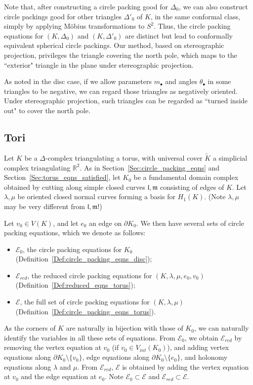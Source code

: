 \documentclass[12pt]{amsart}
\numberwithin{equation}{section}
\theoremstyle{named}
\newcommand{\refsec}[1]{Section~\ref{Sec:#1}}
\newcommand{\refdef}[1]{Definition~\ref{Def:#1}}
\newcommand{\R}{\mathbb{R}}
\begin{document}
Note that, after constructing a circle packing good for $\Delta_0$, we can also construct circle packings good for other triangles $\Delta'_0$ of $K$, in the same conformal class, simply by applying M\"{o}bius transformations to $S^2$. Thus, the circle packing equations for $(K, \Delta_0)$ and $(K, \Delta'_0)$ are distinct but lead to conformally equivalent spherical circle packings. Our method, based on stereographic projection, privileges the triangle covering the north pole, which maps to the ``exterior" triangle in the plane under stereographic projection. 

As noted in the disc case, if we allow parameters $m_\bullet$ and angles $\theta_\bullet$ in some triangles to be negative, we can regard those triangles as negatively oriented. Under stereographic projection, such triangles can be regarded as ``turned inside out" to cover the north pole.



\subsection{Tori}
\label{Sec:tori}


Let $K$ be a $\Delta$-complex triangulating a torus, with universal cover $\widetilde{K}$ a simplicial complex triangulating $\R^2$. As in \refsec{circle_packing_eqns} and \refsec{torus_eqns_satisfied}, let $K_0$ be a fundamental domain complex obtained by cutting along simple closed curves $\mathfrak{l}, \mathfrak{m}$ consisting of edges of $K$. Let $\lambda, \mu$ be oriented closed normal curves forming a basis for $H_1 (K)$. (Note $\lambda, \mu$ may be very different from $\mathfrak{l},\mathfrak{m}$!)

Let $v_0 \in V(K)$, and let $e_0$ an edge on $\partial K_0$. We then have several sets of circle packing equations, which we denote as follows:
\begin{itemize}
\item $\mathcal{E}_0$, the circle packing equations for $K_0$ (\refdef{circle_packing_eqns_disc});
\item $\mathcal{E}_{red}$, the reduced circle packing equations for $(K, \lambda, \mu, e_0, v_0)$ (\refdef{reduced_eqns_torus});
\item $\mathcal{E}$, the full set of circle packing equations for $(K, \lambda, \mu)$ (\refdef{circle_packing_eqns_torus}).
\end{itemize}
As the corners of $K$ are naturally in bijection with those of $K_0$, we can naturally identify the variables in all these sets of equations. From $\mathcal{E}_0$, we obtain $\mathcal{E}_{red}$ by removing the vertex equation at $v_0$ (if $v_0 \in V_{int}(K_0)$), and adding vertex equations along $\partial K_0 \setminus \{v_0\}$, edge equations along $\partial K_0 \setminus \{e_0\}$, and holonomy equations along $\lambda$ and $\mu$. From $\mathcal{E}_{red}$, $\mathcal{E}$ is obtained by adding the vertex equation at $v_0$ and the edge equation at $e_0$. Note $\mathcal{E}_0 \subset \mathcal{E}$ and $\mathcal{E}_{red} \subset \mathcal{E}$.
\end{document}
